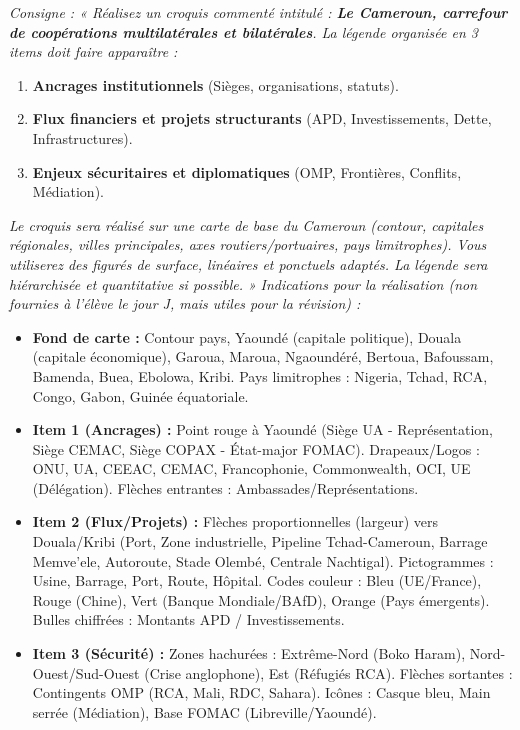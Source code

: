 \documentclass[11pt]{article}
\begin{document}
\begin{exercice}
\emph{Consigne : « Réalisez un croquis commenté intitulé : \textbf{Le Cameroun, carrefour de coopérations multilatérales et bilatérales}. La légende organisée en 3 items doit faire apparaître :}
\begin{enumerate}
    \item \textbf{Ancrages institutionnels} (Sièges, organisations, statuts).
    \item \textbf{Flux financiers et projets structurants} (APD, Investissements, Dette, Infrastructures).
    \item \textbf{Enjeux sécuritaires et diplomatiques} (OMP, Frontières, Conflits, Médiation).
\end{enumerate}
\emph{Le croquis sera réalisé sur une carte de base du Cameroun (contour, capitales régionales, villes principales, axes routiers/portuaires, pays limitrophes). Vous utiliserez des figurés de surface, linéaires et ponctuels adaptés. La légende sera hiérarchisée et quantitative si possible. »}
\vspace{0.5cm}
\emph{Indications pour la réalisation (non fournies à l'élève le jour J, mais utiles pour la révision) :}
\begin{itemize}
    \item \textbf{Fond de carte :} Contour pays, Yaoundé (capitale politique), Douala (capitale économique), Garoua, Maroua, Ngaoundéré, Bertoua, Bafoussam, Bamenda, Buea, Ebolowa, Kribi. Pays limitrophes : Nigeria, Tchad, RCA, Congo, Gabon, Guinée équatoriale.
    \item \textbf{Item 1 (Ancrages) :} Point rouge à Yaoundé (Siège UA - Représentation, Siège CEMAC, Siège COPAX - État-major FOMAC). Drapeaux/Logos : ONU, UA, CEEAC, CEMAC, Francophonie, Commonwealth, OCI, UE (Délégation). Flèches entrantes : Ambassades/Représentations.
    \item \textbf{Item 2 (Flux/Projets) :} Flèches proportionnelles (largeur) vers Douala/Kribi (Port, Zone industrielle, Pipeline Tchad-Cameroun, Barrage Memve'ele, Autoroute, Stade Olembé, Centrale Nachtigal). Pictogrammes : Usine, Barrage, Port, Route, Hôpital. Codes couleur : Bleu (UE/France), Rouge (Chine), Vert (Banque Mondiale/BAfD), Orange (Pays émergents). Bulles chiffrées : Montants APD / Investissements.
    \item \textbf{Item 3 (Sécurité) :} Zones hachurées : Extrême-Nord (Boko Haram), Nord-Ouest/Sud-Ouest (Crise anglophone), Est (Réfugiés RCA). Flèches sortantes : Contingents OMP (RCA, Mali, RDC, Sahara). Icônes : Casque bleu, Main serrée (Médiation), Base FOMAC (Libreville/Yaoundé).
\end{itemize}
\end{exercice}
\end{document}
